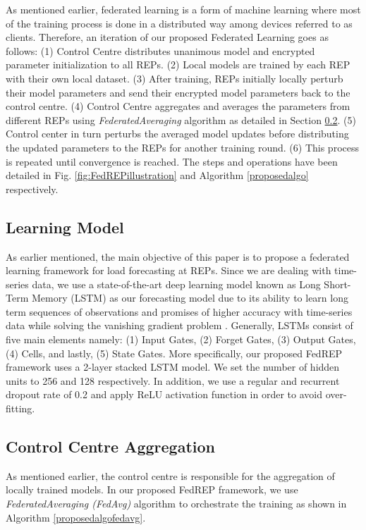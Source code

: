 \documentclass[10pt, conference]{IEEEtran}
\begin{document}
As mentioned earlier, federated learning is a form of machine learning where most of the training process is done in a distributed way among devices referred to as clients. Therefore, an iteration of our proposed Federated Learning goes as follows: (1) Control Centre distributes unanimous model and encrypted parameter initialization to all REPs. (2) Local models are trained by each REP with their own local dataset. (3) After training, REPs initially locally perturb their model parameters and send their encrypted model parameters back to the control centre. (4) Control Centre aggregates and averages the parameters from different REPs using \textit{FederatedAveraging} algorithm as detailed in Section \ref{sec:Fedavg}. (5) Control center in turn perturbs the averaged model updates before distributing the updated parameters to the REPs for another training round. (6) This process is repeated until convergence is reached. The steps and operations have been detailed in Fig. \ref{fig:FedREPillustration} and Algorithm \ref{proposedalgo} respectively. 

\subsection{Learning Model}

As earlier mentioned, the main objective of this paper is to propose a federated learning framework for load forecasting at REPs. Since we are dealing with time-series data, we use a state-of-the-art deep learning model known as Long Short-Term Memory (LSTM) as our forecasting model due to its ability to learn long term  sequences  of  observations and promises of higher accuracy with time-series data while solving the vanishing gradient problem \cite{elsworth2020time}. Generally, LSTMs consist of five main elements namely: (1) Input Gates, (2) Forget Gates, (3) Output Gates, (4) Cells, and lastly, (5) State Gates. More specifically, our proposed FedREP framework uses a 2-layer stacked LSTM model. We set the number of hidden units to 256 and 128 respectively. In addition, we use a regular and recurrent dropout rate of 0.2 and apply ReLU activation function in order to avoid over-fitting.

\subsection{Control Centre Aggregation}
\label{sec:Fedavg}

As mentioned earlier, the control centre is responsible for the aggregation of locally trained models. In our proposed FedREP framework, we use \textit{FederatedAveraging (FedAvg)} algorithm to orchestrate the training as shown in Algorithm \ref{proposedalgofedavg}.
\end{document}
